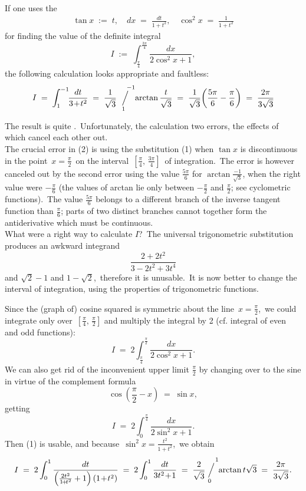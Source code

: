 \documentclass[12pt]{article}
\newcommand{\sijoitus}[2]%
{\operatornamewithlimits{\Big/}_{\!\!\!#1}^{\,#2}}
\begin{document}
If one uses the 
\begin{align}
\tan{x} \;:=\; t, \quad dx \;=\; \frac{dt}{1\!+\!t^2},\quad \cos^2x \;=\; \frac{1}{1\!+\!t^2}
\end{align}
for finding the value of the definite integral
$$I \;:=\; \int_{\frac{\pi}{4}}^{\frac{3\pi}{4}}\frac{dx}{2\cos^2x+1},$$
the following calculation looks appropriate and faultless:
\begin{align}
I \;=\; \int_1^{-1}\!\!\frac{dt}{3\!+\!t^2} 
    \;=\; \frac{1}{\sqrt{3}}\!\!\sijoitus{1}{\;\quad -1}\!\arctan\frac{t}{\sqrt{3}}
    \;=\; \frac{1}{\sqrt{3}}\!\left(\frac{5\pi}{6}-\frac{\pi}{6}\right) \;=\; \frac{2\pi}{3\sqrt{3}}
\end{align}

The result is quite .\, Unfortunately, the calculation  two errors, the effects of which cancel each other out.\\

The crucial error in (2) is using the substitution (1) when $\tan{x}$ is discontinuous in the point 
\,$x = \frac{\pi}{2}$\, on the interval \,$[\frac{\pi}{4},\,\frac{3\pi}{4}]$\, of integration.\, The error is however canceled out by the second error using the value $\frac{5\pi}{6}$ for $\arctan\frac{-1}{\sqrt{3}}$, when the right value were $-\frac{\pi}{6}$ (the values of arctan lie only between $-\frac{\pi}{2}$ and $\frac{\pi}{2}$; see cyclometric functions).\, The value $\frac{5\pi}{6}$ belongs to a different branch of the inverse tangent function than $\frac{\pi}{6}$; parts of two distinct branches cannot together form the antiderivative which must be continuous.\\

What were a right way to calculate $I$?\, The universal trigonometric substitution produces an awkward integrand
$$\frac{2\!+\!2t^2}{3\!-\!2t^2\!+\!3t^4}$$
and  $\sqrt{2}-1$ and $1-\sqrt{2}$,\, therefore it is unusable.\, It is now better to change the interval of integration, using the properties of trigonometric functions.

Since the (graph of) cosine squared is symmetric about the line \,$x = \frac{\pi}{2}$,\, we could integrate only over\, 
$[\frac{\pi}{4},\,\frac{\pi}{2}]$ and multiply the integral by 2 (cf. integral of even and odd functions):
$$I \;=\; 2\int_{\frac{\pi}{4}}^{\frac{\pi}{2}}\frac{dx}{2\cos^2x+1}.$$
We can also get rid of the inconvenient upper limit $\frac{\pi}{2}$ by changing over to the sine in virtue of the complement formula 
$$\cos(\frac{\pi}{2}\!-\!x) \;=\; \sin{x},$$
getting
$$I \;=\; 2\int_0^{\frac{\pi}{4}}\frac{dx}{2\sin^2x+1}.$$
Then (1) is usable, and because\, $\sin^2x = \frac{t^2}{1\!+\!t^2}$,\, we obtain
$$I \;=\; 2\int_0^1\frac{dt}{\left(\frac{2t^2}{1\!+\!t^2}+1\right)(1\!+\!t^2)}
    \;=\; 2\int_0^1\frac{dt}{3t^2\!+\!1} \;=\; \frac{2}{\sqrt{3}}\!\!\sijoitus{0}{\;\quad 1}\!\arctan{t\sqrt{3}}
    \;=\; \frac{2\pi}{3\sqrt{3}}.$$





\end{document}
